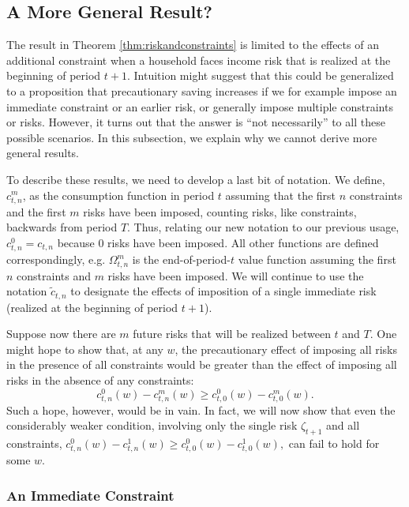 \subsection{A More General Result?}
The result in Theorem \ref{thm:riskandconstraints} is limited to the effects of an additional constraint when a household faces income risk that is realized at the beginning of period $t+1$. Intuition might suggest that this could be generalized to a proposition that  precautionary saving increases if we for example impose an immediate constraint or an earlier risk, or generally impose multiple constraints or risks. However, it turns out that the answer is ``not necessarily'' to all these possible scenarios. In this subsection, we explain why we cannot derive more general results.


To describe these results, we need to develop a last bit of notation.  We define, $c_{t,n}^{m}$, as the consumption function in period $t$ assuming that the first $n$ constraints and the first $m$ risks have been imposed, counting risks, like constraints, backwards from period $T$.  Thus, relating our new notation to our previous usage, $c_{t,n}^{0}=c_{t,n}$ because 0 risks have been imposed. All other functions are defined correspondingly, e.g. $\Omega_{t,n}^{m}$ is the end-of-period-$t$ value function assuming the first $n$ constraints and $m$ risks have been imposed. We will continue to use the notation $\tilde{c}_{t,n}$ to designate the effects of imposition of a single immediate risk (realized at the beginning of period $t+1$).

Suppose now there are $m$ future risks that will be realized between $t$ and $T$. One might hope to show that, at any $w$, the precautionary effect of imposing all risks in the presence of all constraints would be greater than the effect of imposing all risks in the absence of any
constraints:
\begin{equation}
  c_{t,n}^{0}(w) - c_{t,n}^{m}(w) \geq c_{t,0}^{0}(w) - c_{t,0}^{m}(w).\label{eq:nottrue}
\end{equation}
Such a hope, however, would be in vain.  In fact, we will now show that even the considerably weaker condition, involving only the single risk $\zeta_{t+1}$ and all constraints, $c_{t,n}^{0}(w) - c_{t,n}^{1}(w) \geq c_{t,0}^{0}(w) - c_{t,0}^{1}(w),$ can fail to hold for some $w$.


\subsubsection{An Immediate Constraint}\label{subsubsec:ImmediateConstr}


